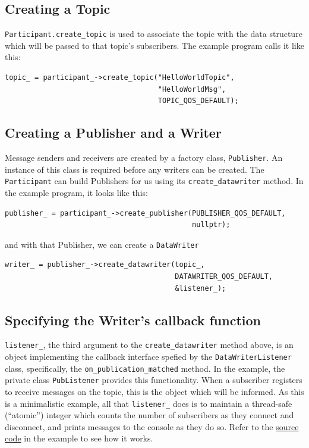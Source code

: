 \documentclass[12pt]{report}
\begin{document}
\subsection{Creating a Topic}

\texttt{Participant.create\_topic} is used to associate the topic with the
data structure which will be passed to that topic's subscribers.
The example program calls it like this:
\begin{verbatim}
topic_ = participant_->create_topic("HelloWorldTopic",
                                    "HelloWorldMsg",
                                    TOPIC_QOS_DEFAULT);
\end{verbatim}

\subsection{Creating a Publisher and a Writer}

Message senders and receivers  are created by a factory class, \texttt{Publisher}.
An instance of this class is required before any writers can be created.
The \texttt{Participant} can build Publishers for us using its \texttt{create\_datawriter}
method. In the example program, it looks like this:
\begin{verbatim}
publisher_ = participant_->create_publisher(PUBLISHER_QOS_DEFAULT,
                                            nullptr);
\end{verbatim}
and with that Publisher, we can create a \texttt{DataWriter}
\begin{verbatim}
writer_ = publisher_->create_datawriter(topic_,
                                        DATAWRITER_QOS_DEFAULT,
                                        &listener_);
\end{verbatim}

\subsection{Specifying the Writer's callback function}

\texttt{listener\_}, the third argument to the \texttt{create\_datawriter} method
above, is an object implementing the callback interface
spefied by the \texttt{DataWriterListener} class, specifically,
the \texttt{on\_publication\_matched} method. In the example,
the private class \texttt{PubListener} provides this functionality.
When a subscriber registers to receive messages on the topic, this is the object
which will be informed. As this is a minimalistic example, all that
\texttt{listener\_} does is to maintain a thread-safe (``atomic'') integer
which counts the number of subscribers as they connect and disconnect,
and prints messages to the console as they do so. Refer to the
\href{https://github.com/berndporr/fastdds_demo/blob/main/HelloWorldPublisher.cpp#L50}{source code} in the example to see how it works.
\end{document}
